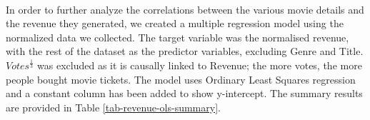         \paragraph{}
        In order to further analyze the correlations between the various movie details
        and the revenue they generated, we created a multiple regression model using the
        normalized data we collected. 
        The target variable was the normalised revenue, with the rest of the dataset as the 
            predictor variables, excluding Genre and Title.
        $Votes^\frac{1}{3}$ was excluded as it is causally linked to Revenue; the more votes, the more people bought movie tickets. 
        The model uses Ordinary Least Squares regression and a constant column has been added to show y-intercept.
        The summary results are provided in Table \ref{tab-revenue-ols-summary}.
